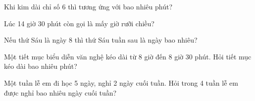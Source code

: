 \begin{ex} %
Khi kim dài chỉ số 6 thì tương ứng với bao nhiêu phút?
\end{ex}

\begin{ex} %
Lúc 14 giờ 30 phút còn gọi là mấy giờ rưỡi chiều?
\end{ex}

\begin{ex} %
Nếu thứ Sáu là ngày 8 thì thứ Sáu tuần sau là ngày bao nhiêu?
\end{ex}

\begin{ex} %
Một tiết mục biểu diễn văn nghệ kéo dài từ 8 giờ đến 8 giờ 30 phút. Hỏi tiết mục kéo dài bao nhiêu phút?
\end{ex}

\begin{ex} %
Một tuần lễ em đi học 5 ngày, nghỉ 2 ngày cuối tuần. Hỏi trong 4 tuần lễ em được nghỉ bao nhiêu ngày cuối tuần?
\end{ex}
